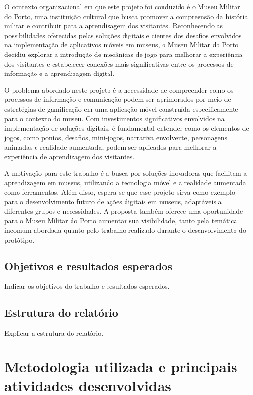 \documentclass[10pt]{article}
\begin{document}
O contexto organizacional em que este projeto foi conduzido é o Museu Militar do Porto, uma instituição cultural que busca promover a compreensão da história militar e contribuir para a aprendizagem dos visitantes. Reconhecendo as possibilidades oferecidas pelas soluções digitais e cientes dos desafios envolvidos na implementação de aplicativos móveis em museus, o Museu Militar do Porto decidiu explorar a introdução de mecânicas de jogo para melhorar a experiência dos visitantes e estabelecer conexões mais significativas entre os processos de informação e a aprendizagem digital.

O problema abordado neste projeto é a necessidade de compreender como os processos de informação e comunicação podem ser aprimorados por meio de estratégias de gamificação em uma aplicação móvel construída especificamente para o contexto do museu. Com investimentos significativos envolvidos na implementação de soluções digitais, é fundamental entender como os elementos de jogos, como pontos, desafios, mini-jogos, narrativa envolvente, personagens animadas e realidade aumentada, podem ser aplicados para melhorar a experiência de aprendizagem dos visitantes.

A motivação para este trabalho é a busca por soluções inovadoras que facilitem a aprendizagem em museus, utilizando a tecnologia móvel e a realidade aumentada como ferramentas. Além disso, espera-se que esse projeto sirva como exemplo para o desenvolvimento futuro de ações digitais em museus, adaptáveis a diferentes grupos e necessidades. A proposta também oferece uma oportunidade para o Museu Militar do Porto aumentar sua visibilidade, tanto pela temática incomum abordada quanto pelo trabalho realizado durante o desenvolvimento do protótipo.

\subsection{Objetivos e resultados esperados}

Indicar os objetivos do trabalho e resultados esperados.

\subsection{Estrutura do relatório}

Explicar a estrutura do relatório.




\section{Metodologia utilizada e principais atividades desenvolvidas}
\end{document}
